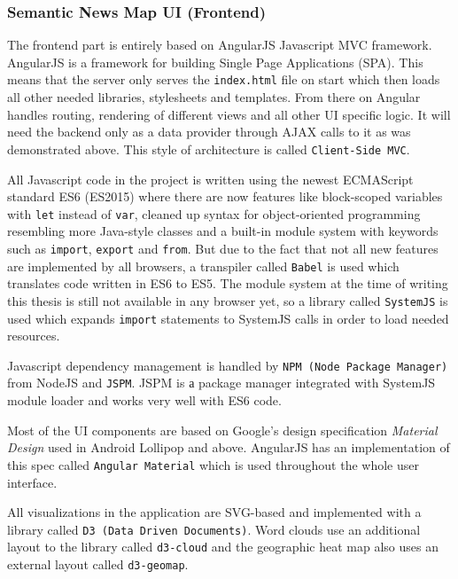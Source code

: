 \subsubsection{Semantic News Map UI (Frontend)}
The frontend part is entirely based on AngularJS Javascript MVC framework. AngularJS is a framework for building Single Page Applications (SPA). This means that the server only serves the \texttt{index.html} file on start which then loads all other needed libraries, stylesheets and templates. From there on Angular handles routing, rendering of different views and all other UI specific logic. It will need the backend only as a data provider through AJAX calls to it as was demonstrated above. This style of architecture is called \texttt{Client-Side MVC}.

All Javascript code in the project is written using the newest ECMAScript standard ES6 (ES2015) where there are now features like block-scoped variables with \texttt{let} instead of \texttt{var}, cleaned up syntax for object-oriented programming resembling more Java-style classes and a built-in module system with keywords such as \texttt{import}, \texttt{export} and \texttt{from}. But due to the fact that not all new features are implemented by all browsers, a transpiler called \texttt{Babel} is used which translates code written in ES6 to ES5. The module system at the time of writing this thesis is still not available in any browser yet, so a library called \texttt{SystemJS} is used which expands \texttt{import} statements to SystemJS calls in order to load needed resources.

Javascript dependency management is handled by \texttt{NPM (Node Package Manager)} from NodeJS and \texttt{JSPM}. JSPM is а package manager integrated with SystemJS module loader and works very well with ES6 code.

Most of the UI components are based on Google's design specification \textit{Material Design} used in Android Lollipop and above. AngularJS has an implementation of this spec called \texttt{Angular Material} which is used throughout the whole user interface.

All visualizations in the application are SVG-based and implemented with a library called \texttt{D3 (Data Driven Documents)}. Word clouds use an additional layout to the library called \texttt{d3-cloud} and the geographic heat map also uses an external layout called \texttt{d3-geomap}.
